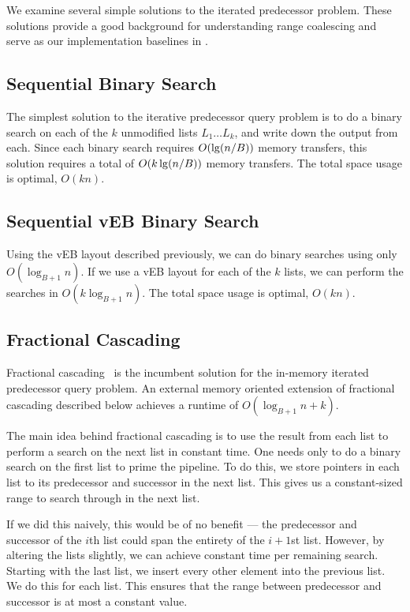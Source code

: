 We examine several simple solutions to the iterated predecessor problem. 
These solutions provide a good background for understanding range coalescing and
serve as our implementation baselines in .

\subsection*{Sequential Binary Search}
The simplest solution to the iterative predecessor query problem 
is to do a binary search on each of the $k$ unmodified lists 
$L_1 \ldots L_k$, and write 
down the output from each. Since each binary search requires $O(\lg \mathopen{}\left(n/B\right)\mathclose{})$ memory transfers, 
this solution requires a total of $O(k \lg \mathopen{}\left(n/B\right)\mathclose{})$ memory transfers. The total space 
usage is optimal, $O(kn)$.

\subsection*{Sequential vEB Binary Search}
Using the vEB layout described previously, we can do binary searches using only 
$O(\log_{B+1} n)$. If we use a vEB layout for each of the $k$ lists, we can perform 
the searches in $O(k \log_{B+1} n)$. The total space usage is optimal, $O(kn)$.

\subsection*{Fractional Cascading}
Fractional cascading~\cite{ChazelleGu86} is the incumbent solution for the in-memory iterated 
predecessor query problem. An external memory oriented extension of fractional cascading
described below achieves a runtime of $O(\log_{B+1} n + k)$.

The main idea behind fractional cascading is to use the result from 
each list to perform a search on the next list in 
constant time.  One needs only to do a binary search on the first list to prime the
pipeline.  To do this, we store pointers in each list to its predecessor and 
successor in the next list. This gives us a constant-sized range to 
search through in the next list.

If we did this naively, this would be of no benefit --- the predecessor and 
successor of the $i$th list could span the entirety of the $i+1$st list. 
However, by altering the lists slightly, 
we can achieve constant time per remaining search. Starting with the last list, 
we insert every other element into the previous list. We do this for each list. 
This ensures that the range between predecessor and successor is at most a constant value.

